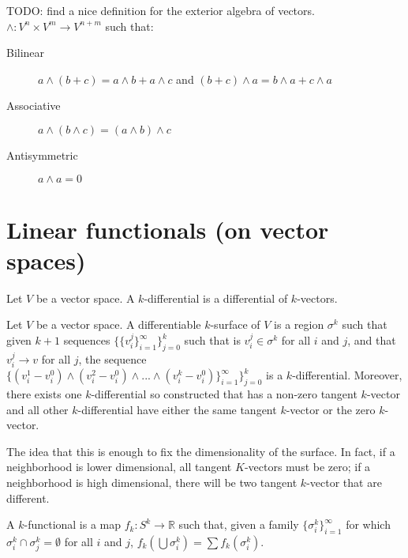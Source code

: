 \documentclass[11pt,letterpaper,fleqn]{memoir}
\begin{document}
\begin{defn}
	TODO: find a nice definition for the exterior algebra of vectors.
	$\wedge : V^n \times V^m \to V^{n+m}$ such that:
	\begin{description}
		\item[Bilinear] $a \wedge(b + c) = a \wedge b + a \wedge c$ and $(b + c) \wedge a= b \wedge a + c \wedge a$
		\item[Associative] $a \wedge (b \wedge c) = (a \wedge b) \wedge c$
		\item[Antisymmetric] $a \wedge a = 0$
	\end{description}
	
\end{defn}


\section{Linear functionals (on vector spaces)}

\begin{defn}
	Let $V$ be a vector space. A $k$-differential is a differential of  $k$-vectors.
\end{defn}

\begin{defn}
	Let $V$ be a vector space. A differentiable $k$-surface of $V$ is a region $\sigma^k$ such that given $k+1$ sequences $\{ \{ {v}^j_i \}_{i=1}^{\infty}\}_{j=0}^{k}$ such that is ${v}^j_i \in \sigma^k$ for all $i$ and $j$, and that ${v}^j_i \to v$ for all $j$, the sequence $\{ ({v}^1_i - {v}^0_i) \wedge ({v}^2_i - {v}^0_i) \wedge ... \wedge ({v}^k_i - {v}^0_i) \}_{i=1}^{\infty}\}_{j=0}^{k}$ is a $k$-differential. Moreover, there exists one $k$-differential so constructed that has a non-zero tangent $k$-vector and all other $k$-differential have either the same tangent $k$-vector or the zero $k$-vector.
\end{defn}

\begin{remark}
	The idea that this is enough to fix the dimensionality of the surface. In fact, if a neighborhood is lower dimensional, all tangent $K$-vectors must be zero; if a neighborhood is high dimensional, there will be two tangent $k$-vector that are different.
\end{remark}

\begin{defn}
	A $k$-functional is a map $f_k : S^k \to \mathbb{R}$ such that,  given a family $\{ \sigma^k_i\}_{i=1}^{\infty}$ for which $\sigma^k_i \cap \sigma^k_j = \emptyset$ for all $i$ and $j$, $f_k(\bigcup \sigma^k_i) = \sum f_k(\sigma^k_i)$.
\end{defn}
\end{document}
